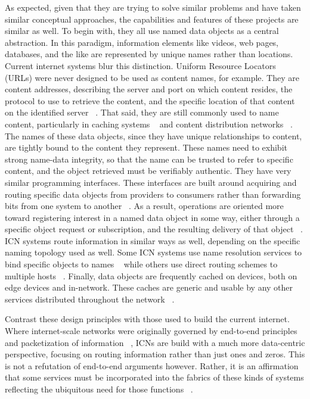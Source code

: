 As expected, given that they are trying to solve similar problems and have taken similar conceptual approaches, the capabilities and features of these projects are similar as well.  To begin with, they all use named data objects as a central abstraction.  In this paradigm, information elements like videos, web pages, databases, and the like are represented by unique names rather than locations.  Current internet systems blur this distinction.  Uniform Resource Locators (URLs) were never designed to be used as content names, for example.  They are content addresses, describing the server and port on which content resides, the protocol to use to retrieve the content, and the specific location of that content on the identified server ~\cite{rfc3986}.  That said, they are still commonly used to name content, particularly in caching systems ~\cite{rfc2616} and content distribution networks ~\cite{Nygren:2010:ANP:1842733.1842736}.  The names of these data objects, since they have unique relationships to content, are tightly bound to the content they represent.  These names need to exhibit strong name-data integrity, so that the name can be trusted to refer to specific content, and the object retrieved must be verifiably authentic.  They have very similar programming interfaces.  These interfaces are built around acquiring and routing specific data objects from providers to consumers rather than forwarding bits from one system to another ~\cite{rfc791,rfc793}.  As a result, operations are oriented more toward registering interest in a named data object in some way, either through a specific object request or subscription, and the resulting delivery of that object ~\cite{6231276}.  ICN systems route information in similar ways as well, depending on the specific naming topology used as well.  Some ICN systems use name resolution services to bind specific objects to names ~\cite{4698847} while others use direct routing schemes to multiple hosts ~\cite{Ghodsi:2011:NCA:2018584.2018586}.  Finally, data objects are frequently cached on devices, both on edge devices and in-network.  These caches are generic and usable by any other services distributed throughout the network ~\cite{6231276}.

Contrast these design principles with those used to build the current internet.  Where internet-scale networks were originally governed by end-to-end principles and packetization of information ~\cite{Cl:88,SaReCl:84}, ICNs are build with a much more data-centric perspective, focusing on routing information rather than just ones and zeros.  This is not a refutation of end-to-end arguments however.  Rather, it is an affirmation that some services must be incorporated into the fabrics of these kinds of systems reflecting the ubiquitous need for those functions ~\cite{BlCl:01}.

%
%
%
	